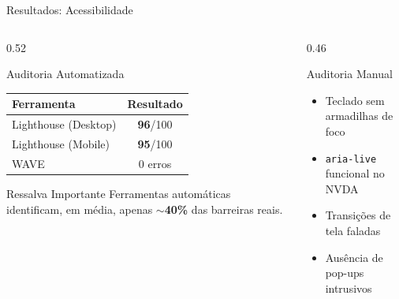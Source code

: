 \documentclass[aspectratio=169]{beamer}
\begin{document}
\begin{frame}{Resultados: Acessibilidade}
    \begin{columns}[T]
        \begin{column}{0.52\textwidth}
            \begin{block}{Auditoria Automatizada}
                \centering
                \small
                \begin{tabular}{lc}
                    \toprule
                    \textbf{Ferramenta} & \textbf{Resultado} \\
                    \midrule
                    Lighthouse (Desktop) & \textbf{96}/100 \\
                    Lighthouse (Mobile) & \textbf{95}/100 \\
                    WAVE & 0 erros \\
                    \bottomrule
                \end{tabular}
            \end{block}

            \vspace{0.15cm}

            \begin{alertblock}{Ressalva Importante}
                \small
                Ferramentas automáticas identificam, em média, apenas \textbf{$\sim$40\%} das barreiras reais.
            \end{alertblock}
        \end{column}
        \begin{column}{0.46\textwidth}
            \begin{block}{Auditoria Manual}
                \begin{itemize}\small
                    \item[$\checkmark$] Teclado sem armadilhas de foco
                    \item[$\checkmark$] \texttt{aria-live} funcional no NVDA
                    \item[$\checkmark$] Transições de tela faladas
                    \item[$\checkmark$] Ausência de pop-ups intrusivos
                \end{itemize}
            \end{block}
        \end{column}
    \end{columns}

\end{frame}
\end{document}
